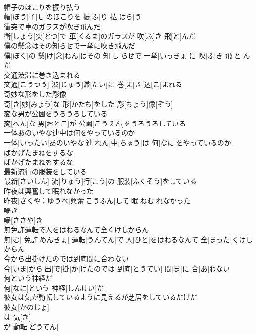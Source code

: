 \documentclass[8pt]{extreport}
\begin{document}
\begin{CJK}{UTF8}{min}
\\	帽子のほこりを振り払う	
\\	帽[ぼう]子[し]のほこりを 振[ふ]り 払[はら]う
\\	衝突で車のガラスが吹き飛んだ	
\\	衝[しょう]突[とつ]で 車[くるま]のガラスが 吹[ふ]き 飛[と]んだ
\\	僕の懸念はその知らせで一挙に吹き飛んだ	
\\	僕[ぼく]の 懸[け]念[ねん]はその 知[し]らせで 一挙[いっきょ]に 吹[ふ]き 飛[と]んだ
\\	交通渋滞に巻き込まれる	
\\	交通[こうつう] 渋[じゅう]滞[たい]に 巻[ま]き 込[こ]まれる
\\	奇妙な形をした彫像	
\\	奇[き]妙[みょう]な 形[かたち]をした 彫[ちょう]像[ぞう]
\\	変な男が公園をうろうろしている	
\\	変[へん]な 男[おとこ]が 公園[こうえん]をうろうろしている
\\	一体あのいやな連中は何をやっているのか	
\\	一体[いったい]あのいやな 連[れん]中[ちゅう]は 何[なに]をやっているのか
\\	ばかげたまねをするな	
\\	ばかげたまねをするな
\\	最新流行の服装をしている	
\\	最新[さいしん] 流[りゅう]行[こう]の 服装[ふくそう]をしている
\\	昨夜は興奮して眠れなかった	
\\	昨夜[さくや；ゆうべ]興奮[こうふん]して 眠[ねむ]れなかった
\\	囁き	
\\	囁[ささや]き
\\	無免許運転で人をはねるなんて全くけしからん	
\\	無[む] 免許[めんきょ] 運転[うんてん]で 人[ひと]をはねるなんて 全[まった]くけしからん
\\	今から出掛けたのでは到底間に合わない	
\\	今[いま]から 出[で]掛[か]けたのでは 到底[とうてい] 間[ま]に 合[あ]わない
\\	何という神経だ	
\\	何[なに]という 神経[しんけい]だ
\\	彼女は気が動転しているように見えるが芝居をしているだけだ	
\\	彼女[かのじょ]
\\	は 気[き]
\\	が 動転[どうてん]

\end{CJK}
\end{document}
